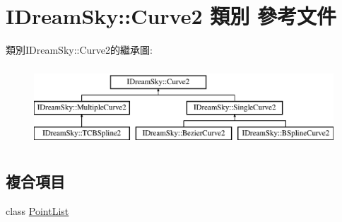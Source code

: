 \hypertarget{class_i_dream_sky_1_1_curve2}{}\section{I\+Dream\+Sky\+:\+:Curve2 類別 參考文件}
\label{class_i_dream_sky_1_1_curve2}
類別\+I\+Dream\+Sky\+:\+:Curve2的繼承圖\+:\begin{figure}[H]
\begin{center}
\leavevmode
\includegraphics[height=3.000000cm]{class_i_dream_sky_1_1_curve2}
\end{center}
\end{figure}
\subsection*{複合項目}
\begin{DoxyCompactItemize}
\item 
class \hyperlink{class_i_dream_sky_1_1_curve2_1_1_point_list}{Point\+List}
\end{DoxyCompactItemize}
